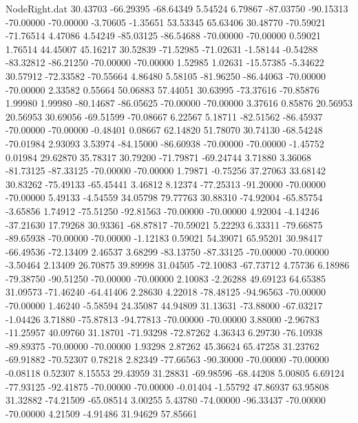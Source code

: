 \begin{filecontents}{NodeRight.dat}
  30.43703  -66.29395  -68.64349     5.54524    6.79867  -87.03750  -90.15313  -70.00000  -70.00000   -3.70605   -1.35651   53.53345   65.63406
  30.48770  -70.59021  -71.76514     4.47086    4.54249  -85.03125  -86.54688  -70.00000  -70.00000    0.59021    1.76514   44.45007   45.16217
  30.52839  -71.52985  -71.02631    -1.58144   -0.54288  -83.32812  -86.21250  -70.00000  -70.00000    1.52985    1.02631  -15.57385   -5.34622
  30.57912  -72.33582  -70.55664     4.86480    5.58105  -81.96250  -86.44063  -70.00000  -70.00000    2.33582    0.55664   50.06883   57.44051
  30.63995  -73.37616  -70.85876     1.99980    1.99980  -80.14687  -86.05625  -70.00000  -70.00000    3.37616    0.85876   20.56953   20.56953
  30.69056  -69.51599  -70.08667     6.22567    5.18711  -82.51562  -86.45937  -70.00000  -70.00000   -0.48401    0.08667   62.14820   51.78070
  30.74130  -68.54248  -70.01984     2.93093    3.53974  -84.15000  -86.60938  -70.00000  -70.00000   -1.45752    0.01984   29.62870   35.78317
  30.79200  -71.79871  -69.24744     3.71880    3.36068  -81.73125  -87.33125  -70.00000  -70.00000    1.79871   -0.75256   37.27063   33.68142
  30.83262  -75.49133  -65.45441     3.46812    8.12374  -77.25313  -91.20000  -70.00000  -70.00000    5.49133   -4.54559   34.05798   79.77763
  30.88310  -74.92004  -65.85754    -3.65856    1.74912  -75.51250  -92.81563  -70.00000  -70.00000    4.92004   -4.14246  -37.21630   17.79268
  30.93361  -68.87817  -70.59021     5.22293    6.33311  -79.66875  -89.65938  -70.00000  -70.00000   -1.12183    0.59021   54.39071   65.95201
  30.98417  -66.49536  -72.13409     2.46537    3.68299  -83.13750  -87.33125  -70.00000  -70.00000   -3.50464    2.13409   26.70875   39.89998
  31.04505  -72.10083  -67.73712     4.75736    6.18986  -79.38750  -90.51250  -70.00000  -70.00000    2.10083   -2.26288   49.69123   64.65385
  31.09573  -71.46240  -64.41406     2.28630    4.22018  -78.48125  -94.96563  -70.00000  -70.00000    1.46240   -5.58594   24.35087   44.94809
  31.13631  -73.88000  -67.03217    -1.04426    3.71880  -75.87813  -94.77813  -70.00000  -70.00000    3.88000   -2.96783  -11.25957   40.09760
  31.18701  -71.93298  -72.87262     4.36343    6.29730  -76.10938  -89.89375  -70.00000  -70.00000    1.93298    2.87262   45.36624   65.47258
  31.23762  -69.91882  -70.52307     0.78218    2.82349  -77.66563  -90.30000  -70.00000  -70.00000   -0.08118    0.52307    8.15553   29.43959
  31.28831  -69.98596  -68.44208     5.00805    6.69124  -77.93125  -92.41875  -70.00000  -70.00000   -0.01404   -1.55792   47.86937   63.95808
  31.32882  -74.21509  -65.08514     3.00255    5.43780  -74.00000  -96.33437  -70.00000  -70.00000    4.21509   -4.91486   31.94629   57.85661

\end{filecontents}
